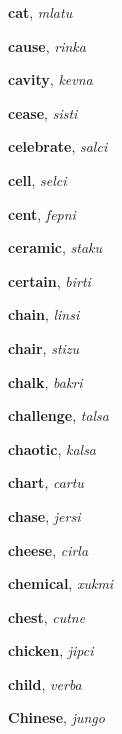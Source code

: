 \documentclass[12pt]{book}
\begin{document}
\begin{description}
\item[ ] \textbf{cat}, \textit{mlatu}

\item[ ] \textbf{cause}, \textit{rinka}

\item[ ] \textbf{cavity}, \textit{kevna}

\item[ ] \textbf{cease}, \textit{sisti}

\item[ ] \textbf{celebrate}, \textit{salci}

\item[ ] \textbf{cell}, \textit{selci}

\item[ ] \textbf{cent}, \textit{fepni}

\item[ ] \textbf{ceramic}, \textit{staku}

\item[ ] \textbf{certain}, \textit{birti}

\item[ ] \textbf{chain}, \textit{linsi}

\item[ ] \textbf{chair}, \textit{stizu}

\item[ ] \textbf{chalk}, \textit{bakri}

\item[ ] \textbf{challenge}, \textit{talsa}

\item[ ] \textbf{chaotic}, \textit{kalsa}

\item[ ] \textbf{chart}, \textit{cartu}

\item[ ] \textbf{chase}, \textit{jersi}

\item[ ] \textbf{cheese}, \textit{cirla}

\item[ ] \textbf{chemical}, \textit{xukmi}

\item[ ] \textbf{chest}, \textit{cutne}

\item[ ] \textbf{chicken}, \textit{jipci}

\item[ ] \textbf{child}, \textit{verba}

\item[ ] \textbf{Chinese}, \textit{jungo}


\end{description}
\end{document}
